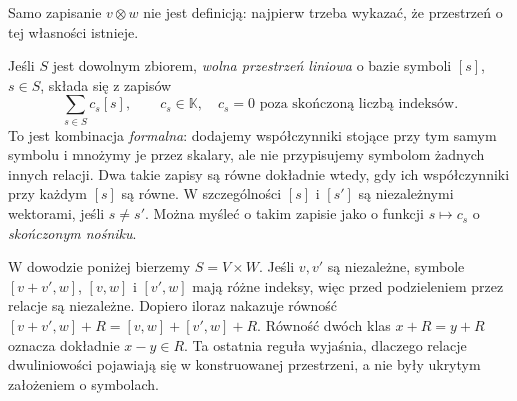 Samo zapisanie $v\otimes w$ nie jest definicją: najpierw trzeba
wykazać, że przestrzeń o tej własności istnieje.

\begin{uwaga}
\label{rem:kombinacje-formalne}
Jeśli $S$ jest dowolnym zbiorem, \emph{wolna przestrzeń liniowa}
o bazie symboli $[s]$, $s\in S$, składa się z zapisów
\[
 \sum_{s\in S} c_s[s],\qquad c_s\in\mathbb K,
 \quad c_s=0\text{ poza skończoną liczbą indeksów}.
\]
To jest kombinacja \emph{formalna}: dodajemy współczynniki
stojące przy tym samym symbolu i mnożymy je przez skalary,
ale nie przypisujemy symbolom żadnych innych relacji.
Dwa takie zapisy są równe dokładnie wtedy, gdy ich
współczynniki przy każdym $[s]$ są równe. W szczególności
$[s]$ i $[s']$ są niezależnymi wektorami, jeśli $s\ne s'$.
Można myśleć o takim zapisie jako o funkcji
$s\mapsto c_s$ o \emph{skończonym nośniku}.

W dowodzie poniżej bierzemy $S=V\times W$. Jeśli
$v,v'$ są niezależne, symbole $[v+v',w]$, $[v,w]$
i $[v',w]$ mają różne indeksy, więc przed podzieleniem
przez relacje są niezależne. Dopiero iloraz nakazuje równość
$[v+v',w]+R=[v,w]+[v',w]+R$.
Równość dwóch klas $x+R=y+R$ oznacza dokładnie $x-y\in R$.
Ta ostatnia reguła wyjaśnia, dlaczego relacje dwuliniowości
pojawiają się w konstruowanej przestrzeni, a nie były
ukrytym założeniem o symbolach.
\end{uwaga}

